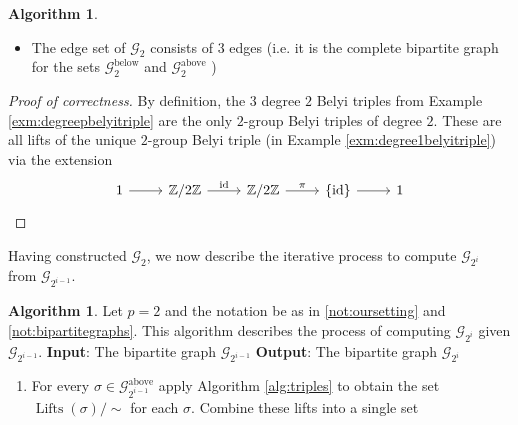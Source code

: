 \documentclass{dcthesis}
\newcommand{\ZZ}{\mathbb Z}
\DeclareMathOperator{\Lifts}{Lifts}
\DeclareMathOperator{\id}{id}
\numberwithin{equation}{section}
\theoremstyle{definition}
\newtheorem{alg}[equation]{Algorithm}
\theoremstyle{remark}
\begin{document}
{{\begin{alg}
\begin{itemize}
        \item
          \label{alg:alltriplesbasecaseedges}
          The edge set of $\mathscr{G}_2$
          consists of $3$ edges
          (i.e. it is the complete
          bipartite graph for the sets
          $\mathscr{G}_2^\text{below}$
          and
          $\mathscr{G}_2^\text{above}$
          )
      \end{itemize}
    \end{alg}
    \begin{proof}[Proof of correctness]
      By definition,
      the $3$ degree $2$ Belyi triples
      from Example \ref{exm:degreepbelyitriple}
      are the only $2$-group Belyi triples
      of degree $2$.
      These are all lifts of the unique
      $2$-group Belyi triple
      (in Example \ref{exm:degree1belyitriple})
      via the extension
      \begin{equation}
        \label{eqn:trivialliftdegree2}
        \begin{tikzcd}
          1\arrow{r}&\ZZ/2\ZZ\arrow{r}{\id}
                    &\ZZ/2\ZZ\arrow{r}{\pi}
                    &\{\id\}\arrow{r}&1
        \end{tikzcd}
      \end{equation}
    \end{proof}
    Having constructed $\mathscr{G}_2$,
    we now describe the iterative process to
    compute $\mathscr{G}_{2^i}$
    from $\mathscr{G}_{2^{i-1}}$.
    \begin{alg}
      \label{alg:alltriplesiteration}
      Let $p=2$ and the notation be as in
      \ref{not:oursetting} and
      \ref{not:bipartitegraphs}.
      This algorithm describes the process
      of computing $\mathscr{G}_{2^i}$
      given $\mathscr{G}_{2^{i-1}}$.
      \newline
      \textbf{Input}:
      The bipartite graph
      $\mathscr{G}_{2^{i-1}}$
      \newline
      \textbf{Output}:
      The bipartite graph
      $\mathscr{G}_{2^{i}}$
      \begin{enumerate}
        \item
          \label{alg:alltriplesiterationcomputelifts}
          For every
          $\sigma\in\mathscr{G}_{2^{i-1}}^\text{above}$
          apply Algorithm \ref{alg:triples}
          to obtain the set
          $\Lifts(\sigma)/\!\!\sim$ for each
          $\sigma$.
          Combine these lifts into a single set
          \begin{equation}
            \label{eqn:unionofliftsabove}

\end{equation}
\end{enumerate}
\end{alg}}}
\end{document}
